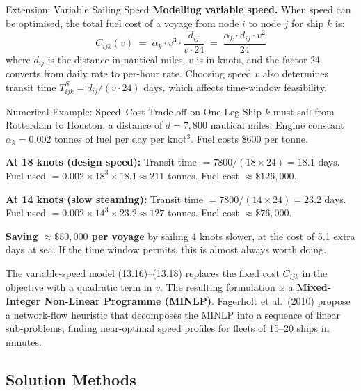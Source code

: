 \documentclass[aspectratio=169,10pt]{beamer}
\begin{document}
\begin{frame}[allowframebreaks]{Extension: Variable Sailing Speed}
  \medskip
  \textbf{Modelling variable speed.}  When speed can be optimised, the
  total fuel cost of a voyage from node $i$ to node $j$ for ship $k$ is:
  \begin{equation}
    C_{ijk}(v) \;=\; \alpha_k \cdot v^3 \cdot \frac{d_{ij}}{v \cdot 24}
                \;=\; \frac{\alpha_k \cdot d_{ij} \cdot v^2}{24}
  \end{equation}
  where $d_{ij}$ is the distance in nautical miles, $v$ is in knots, and
  the factor 24 converts from daily rate to per-hour rate.
  Choosing speed $v$ also determines transit time $T_{ijk}^S = d_{ij}/(v \cdot 24)$
  days, which affects time-window feasibility.

  \begin{exampleblock}{Numerical Example: Speed--Cost Trade-off on One Leg}
    Ship $k$ must sail from Rotterdam to Houston, a distance of
    $d = 7{,}800$ nautical miles.  Engine constant $\alpha_k = 0.002$
    tonnes of fuel per day per knot$^3$.  Fuel costs \$600 per tonne.

    \textbf{At 18 knots (design speed):}
    Transit time $= 7800 / (18 \times 24) = 18.1$ days.
    Fuel used $= 0.002 \times 18^3 \times 18.1 \approx 211$ tonnes.
    Fuel cost $\approx \$126{,}000$.

    \textbf{At 14 knots (slow steaming):}
    Transit time $= 7800 / (14 \times 24) = 23.2$ days.
    Fuel used $= 0.002 \times 14^3 \times 23.2 \approx 127$ tonnes.
    Fuel cost $\approx \$76{,}000$.

    \textbf{Saving $\approx \$50{,}000$ per voyage} by sailing 4 knots slower,
    at the cost of 5.1 extra days at sea.  If the time window permits, this
    is almost always worth doing.
  \end{exampleblock}

  The variable-speed model (13.16)--(13.18) replaces the fixed cost
  $C_{ijk}$ in the objective with a quadratic term in $v$.  The resulting
  formulation is a \textbf{Mixed-Integer Non-Linear Programme (MINLP)}.
  Fagerholt et al.\ (2010) propose a network-flow heuristic that decomposes
  the MINLP into a sequence of linear sub-problems, finding near-optimal
  speed profiles for fleets of 15--20 ships in minutes.
\end{frame}

\subsection{Solution Methods}
\end{document}

